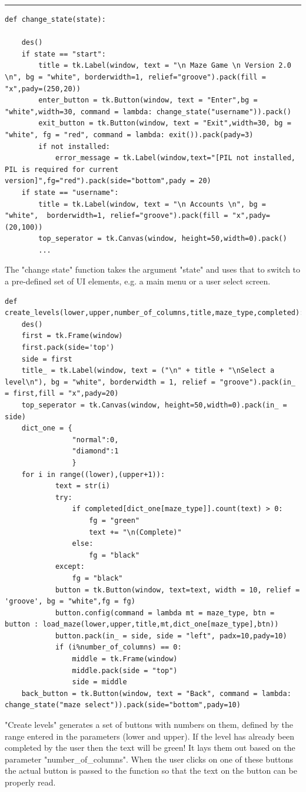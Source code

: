\documentclass{article}
\begin{document}
\textcolor[RGB]{220,220,220}{\rule{\linewidth}{0.2pt}}
\begin{lstlisting}
def change_state(state):      

    des()
    if state == "start":    
        title = tk.Label(window, text = "\n Maze Game \n Version 2.0 \n", bg = "white", borderwidth=1, relief="groove").pack(fill = "x",pady=(250,20))
        enter_button = tk.Button(window, text = "Enter",bg = "white",width=30, command = lambda: change_state("username")).pack()
        exit_button = tk.Button(window, text = "Exit",width=30, bg = "white", fg = "red", command = lambda: exit()).pack(pady=3)
        if not installed:
            error_message = tk.Label(window,text="[PIL not installed, PIL is required for current version]",fg="red").pack(side="bottom",pady = 20)
    if state == "username": 
        title = tk.Label(window, text = "\n Accounts \n", bg = "white",  borderwidth=1, relief="groove").pack(fill = "x",pady=(20,100))
        top_seperator = tk.Canvas(window, height=50,width=0).pack()
        ...
\end{lstlisting}
The "change state" function takes the argument "state" and uses that to switch to a pre-defined set of UI elements, e.g. a main menu or a user select screen.

\begin{lstlisting}
def create_levels(lower,upper,number_of_columns,title,maze_type,completed):
    des()
    first = tk.Frame(window)
    first.pack(side='top')
    side = first
    title_ = tk.Label(window, text = ("\n" + title + "\nSelect a level\n"), bg = "white", borderwidth = 1, relief = "groove").pack(in_ = first,fill = "x",pady=20)
    top_seperator = tk.Canvas(window, height=50,width=0).pack(in_ = side)
    dict_one = {
                "normal":0,
                "diamond":1
                }
    for i in range((lower),(upper+1)):
            text = str(i)                          
            try:
                if completed[dict_one[maze_type]].count(text) > 0:
                    fg = "green"
                    text += "\n(Complete)"
                else:
                    fg = "black"
            except:
                fg = "black"
            button = tk.Button(window, text=text, width = 10, relief = 'groove', bg = "white",fg = fg)
            button.config(command = lambda mt = maze_type, btn = button : load_maze(lower,upper,title,mt,dict_one[maze_type],btn))
            button.pack(in_ = side, side = "left", padx=10,pady=10)
            if (i%number_of_columns) == 0:
                middle = tk.Frame(window)
                middle.pack(side = "top")
                side = middle
    back_button = tk.Button(window, text = "Back", command = lambda: change_state("maze select")).pack(side="bottom",pady=10)

\end{lstlisting}
"Create levels" generates a set of buttons with numbers on them, defined by the range entered in the parameters (lower and upper). If the level has already been completed by the user then the text will be green! It lays them out based on the parameter "number\_of\_columns".
When the user clicks on one of these buttons the actual button is passed to the function so that the text on the button can be properly read.
\end{document}
